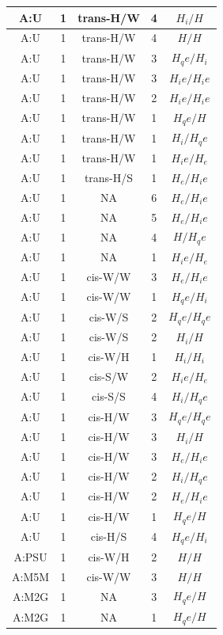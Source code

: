 \begin{center}
\begin{longtable}{c|c|c|c|c}
A:U & 1 & trans-H/W & 4 & $H_i/H$ \\  \hline
A:U & 1 & trans-H/W & 4 & $H/H$ \\  \hline
A:U & 1 & trans-H/W & 3 & $H_qe/H_i$ \\  \hline
A:U & 1 & trans-H/W & 3 & $H_ie/H_ie$ \\  \hline
A:U & 1 & trans-H/W & 2 & $H_ie/H_ie$ \\  \hline
A:U & 1 & trans-H/W & 1 & $H_qe/H$ \\  \hline
A:U & 1 & trans-H/W & 1 & $H_i/H_qe$ \\  \hline
A:U & 1 & trans-H/W & 1 & $H_ie/H_e$ \\  \hline
A:U & 1 & trans-H/S & 1 & $H_e/H_ie$ \\  \hline
A:U & 1 & NA & 6 & $H_e/H_ie$ \\  \hline
A:U & 1 & NA & 5 & $H_e/H_ie$ \\  \hline
A:U & 1 & NA & 4 & $H/H_qe$ \\  \hline
A:U & 1 & NA & 1 & $H_ie/H_e$ \\  \hline
A:U & 1 & cis-W/W & 3 & $H_e/H_ie$ \\  \hline
A:U & 1 & cis-W/W & 1 & $H_qe/H_i$ \\  \hline
A:U & 1 & cis-W/S & 2 & $H_qe/H_qe$ \\  \hline
A:U & 1 & cis-W/S & 2 & $H_i/H$ \\  \hline
A:U & 1 & cis-W/H & 1 & $H_i/H_i$ \\  \hline
A:U & 1 & cis-S/W & 2 & $H_ie/H_e$ \\  \hline
A:U & 1 & cis-S/S & 4 & $H_i/H_qe$ \\  \hline
A:U & 1 & cis-H/W & 3 & $H_qe/H_qe$ \\  \hline
A:U & 1 & cis-H/W & 3 & $H_i/H$ \\  \hline
A:U & 1 & cis-H/W & 3 & $H_e/H_ie$ \\  \hline
A:U & 1 & cis-H/W & 2 & $H_i/H_qe$ \\  \hline
A:U & 1 & cis-H/W & 2 & $H_e/H_ie$ \\  \hline
A:U & 1 & cis-H/W & 1 & $H_qe/H$ \\  \hline
A:U & 1 & cis-H/S & 4 & $H_qe/H_i$ \\  \hline
A:PSU & 1 & cis-W/H & 2 & $H/H$ \\  \hline
A:M5M & 1 & cis-W/W & 3 & $H/H$ \\  \hline
A:M2G & 1 & NA & 3 & $H_qe/H$ \\  \hline
A:M2G & 1 & NA & 1 & $H_qe/H$ \\  \hline

\end{longtable}
\end{center}

